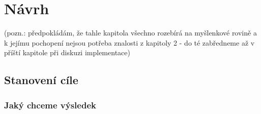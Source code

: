 \chapter{Návrh}

(pozn.: předpokládám, že tahle kapitola všechno rozebírá na myšlenkové rovině a k jejímu pochopení nejsou potřeba znalosti z kapitoly 2 - do té zabředneme až v příští kapitole při diskuzi implementace)

\section{Stanovení cíle}

\subsection{Jaký chceme výsledek}
